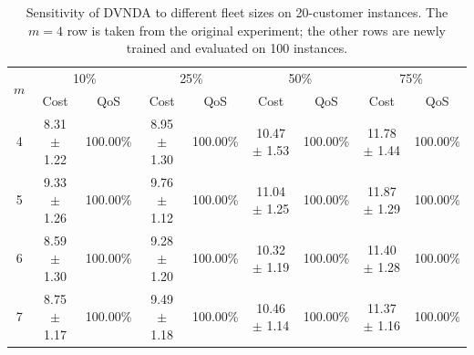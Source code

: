 \begin{table}[htbp]
\centering
\caption{Sensitivity of DVNDA to different fleet sizes on 20-customer instances. The $m=4$ row is taken from the original experiment; the other rows are newly trained and evaluated on 100 instances.}
\label{tab:fleet_size}
\small
\setlength{\tabcolsep}{3.5pt}
\begin{tabular}{c|cc|cc|cc|cc}
\toprule
\multirow{2}{*}{$m$} & \multicolumn{2}{c|}{10\%} & \multicolumn{2}{c|}{25\%} & \multicolumn{2}{c|}{50\%} & \multicolumn{2}{c}{75\%} \\
& Cost & QoS & Cost & QoS & Cost & QoS & Cost & QoS \\
\midrule
4 & 8.31 $\pm$ 1.22 & 100.00\% & 8.95 $\pm$ 1.30 & 100.00\% & 10.47 $\pm$ 1.53 & 100.00\% & 11.78 $\pm$ 1.44 & 100.00\% \\
5 & 9.33 $\pm$ 1.26 & 100.00\% & 9.76 $\pm$ 1.12 & 100.00\% & 11.04 $\pm$ 1.25 & 100.00\% & 11.87 $\pm$ 1.29 & 100.00\% \\
6 & 8.59 $\pm$ 1.30 & 100.00\% & 9.28 $\pm$ 1.20 & 100.00\% & 10.32 $\pm$ 1.19 & 100.00\% & 11.40 $\pm$ 1.28 & 100.00\% \\
7 & 8.75 $\pm$ 1.17 & 100.00\% & 9.49 $\pm$ 1.18 & 100.00\% & 10.46 $\pm$ 1.14 & 100.00\% & 11.37 $\pm$ 1.16 & 100.00\% \\
\bottomrule
\end{tabular}
\end{table}
